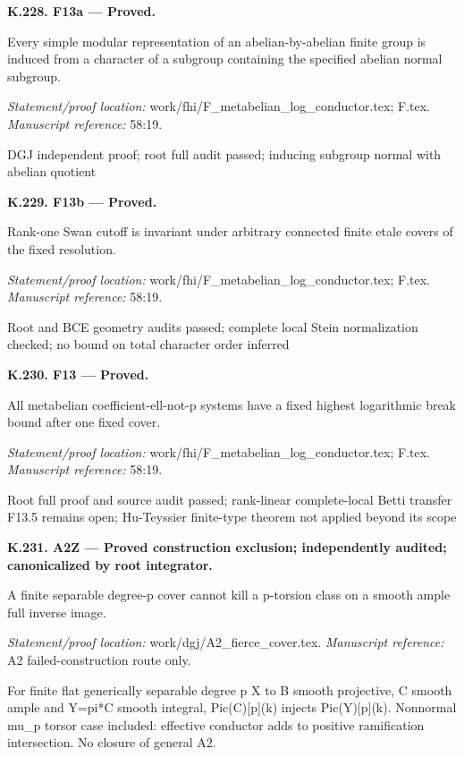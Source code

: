 \par\medskip\noindent\textbf{K.228. F13a --- Proved.}\par
Every simple modular representation of an abelian-by-abelian finite group is induced from a character of a subgroup containing the specified abelian normal subgroup.
\par\emph{Statement/proof location:} work/fhi/F\_metabelian\_log\_conductor.tex; F.tex.
\emph{Manuscript reference:} 58:19.
\par DGJ independent proof; root full audit passed; inducing subgroup normal with abelian quotient
\par\medskip\noindent\textbf{K.229. F13b --- Proved.}\par
Rank-one Swan cutoff is invariant under arbitrary connected finite etale covers of the fixed resolution.
\par\emph{Statement/proof location:} work/fhi/F\_metabelian\_log\_conductor.tex; F.tex.
\emph{Manuscript reference:} 58:19.
\par Root and BCE geometry audits passed; complete local Stein normalization checked; no bound on total character order inferred
\par\medskip\noindent\textbf{K.230. F13 --- Proved.}\par
All metabelian coefficient-ell-not-p systems have a fixed highest logarithmic break bound after one fixed cover.
\par\emph{Statement/proof location:} work/fhi/F\_metabelian\_log\_conductor.tex; F.tex.
\emph{Manuscript reference:} 58:19.
\par Root full proof and source audit passed; rank-linear complete-local Betti transfer F13.5 remains open; Hu-Teyssier finite-type theorem not applied beyond its scope
\par\medskip\noindent\textbf{K.231. A2Z --- Proved construction exclusion; independently audited; canonicalized by root integrator.}\par
A finite separable degree-p cover cannot kill a p-torsion class on a smooth ample full inverse image.
\par\emph{Statement/proof location:} work/dgj/A2\_fierce\_cover.tex.
\emph{Manuscript reference:} A2 failed-construction route only.
\par For finite flat generically separable degree p X to B smooth projective, C smooth ample and Y=pi*C smooth integral, Pic(C)[p](k) injects Pic(Y)[p](k). Nonnormal mu\_p torsor case included: effective conductor adds to positive ramification intersection. No closure of general A2.
